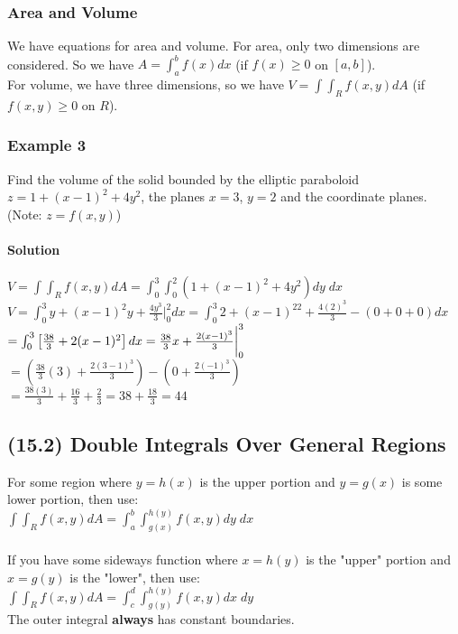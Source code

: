 \documentclass{article}
\newcommand{\Int}[2]{\int_{#1}^{#2}}
\newcommand{\eval}[2]{\bigg|_{#1}^{#2}}
\begin{document}
\newpage
\subsubsection{Area and Volume}
We have equations for area and volume. For area, only two dimensions are considered. So we have $A=\Int{a}{b}f(x)dx$ (if $f(x)\geq0$ on $[a,b]$).
\\For volume, we have three dimensions, so we have $V=\int\Int{R}{}f(x,y)dA$ (if $f(x,y)\geq0$ on $R$).

\subsubsection{Example 3}
Find the volume of the solid bounded by the elliptic paraboloid $z=1+(x-1)^2+4y^2$, the planes $x=3$, $y=2$ and the coordinate planes.
\\(Note: $z=f(x,y)$)
\paragraph{Solution}
$V=\int\Int{R}{}f(x,y)dA=\Int{0}{3}\Int{0}{2}(1+(x-1)^2+4y^2)dy\;dx$
\\$V=\Int{0}{3}y+(x-1)^2y+\frac{4y^3}{3}\eval{0}{2}dx=\Int{0}{3}2+(x-1)^22+\frac{4(2)^3}{3}-(0+0+0)dx$
\\$=\Int{0}{3}\left[\frac{38}{3}+2(x-1)^2\right]dx
\\=\frac{38}{3}x+\frac{2(x-1)^3}{3}\eval{0}{3}$
\\$=\left(\frac{38}{3}(3)+\frac{2(3-1)^3}{3}\right)-\left(0+\frac{2(-1)^3}{3}\right)$
\\$=\frac{38(3)}{3}+\frac{16}{3}+\frac{2}{3}=38+\frac{18}{3}=44$

\subsection{(15.2) Double Integrals Over General Regions}
For some region where $y=h(x)$ is the upper portion and $y=g(x)$ is some lower portion, then use:\\$\int\Int{R}{}f(x,y)dA=\Int{a}{b}\Int{g(x)}{h(y)}f(x,y)dy\;dx$
\\\\If you have some sideways function where $x=h(y)$ is the "upper" portion and $x=g(y)$ is the "lower", then use:\\$\int\Int{R}{}f(x,y)dA=\Int{c}{d}\Int{g(y)}{h(y)}f(x,y)dx\;dy$
\\The outer integral \textbf{always} has constant boundaries.
\end{document}
